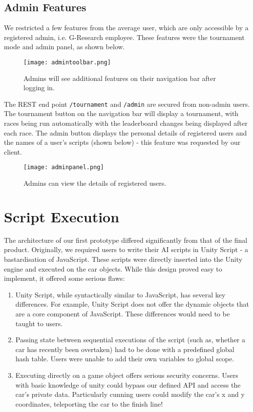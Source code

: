 \subsection{Admin Features}

We restricted a few features from the average user, which are only accessible by a registered admin, i.e. G-Research employee. These features were the tournament mode and admin panel, as shown below.

\begin{figure}[H]
\centering
\texttt{[image: admintoolbar.png]}
\caption{Admins will see additional features on their navigation bar after logging in.}
\end{figure}

The REST end point {\tt/tournament} and {\tt/admin} are secured from non-admin users. The tournament button on the navigation bar will display a tournament, with races being run automatically with the leaderboard changes being displayed after each race. The admin button displays the personal details of registered users and the names of a user's scripts (shown below) - this feature was requested by our client. 
\begin{figure}[H]
\centering
\texttt{[image: adminpanel.png]}
\caption{Admins can view the details of registered users.}
\end{figure}

\section{Script Execution}
The architecture of our first prototype differed significantly from that of the final product. Originally, we required users to write their AI scripts in Unity Script - a bastardisation of JavaScript. These scripts were directly inserted into the Unity engine and executed on the car objects. While this design proved easy to implement, it offered some serious flaws:
\begin{enumerate}
\item Unity Script, while syntactically similar to JavaScript, has several key differences. For example, Unity Script does not offer the dynamic objects that are a core component of JavaScript. These differences would need to be taught to users.
\item Passing state between sequential executions of the script (such as, whether a car has recently been overtaken) had to be done with a predefined global hash table. Users were unable to add their own variables to global scope.
\item Executing directly on a game object offers serious security concerns. Users with basic knowledge of unity could bypass our defined API and access the car's private data. Particularly cunning users could modify the car's x and y coordinates, teleporting the car to the finish line!
\end{enumerate}

